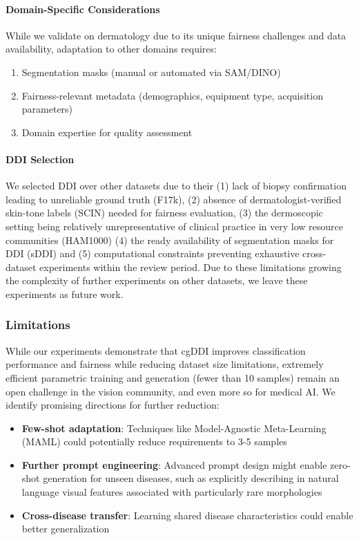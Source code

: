 \documentclass[11pt]{ucthesis}
\begin{document}
\paragraph{Domain-Specific Considerations}
While we validate on dermatology due to its unique fairness challenges and data availability, adaptation to other domains requires:
\begin{enumerate}
    \item Segmentation masks (manual or automated via SAM/DINO)
    \item Fairness-relevant metadata (demographics, equipment type, acquisition parameters)
    \item Domain expertise for quality assessment
\end{enumerate}

\paragraph{DDI Selection}
We selected DDI over other datasets due to their (1) lack of biopsy confirmation leading to unreliable ground truth (F17k), (2) absence of dermatologist-verified skin-tone labels (SCIN) needed for fairness evaluation, (3) the dermoscopic setting being relatively unrepresentative of clinical practice in very low resource communities (HAM1000) (4) the ready availability of segmentation masks for DDI (sDDI) and (5) computational constraints preventing exhaustive cross-dataset experiments within the review period. Due to these limitations growing the complexity of further experiments on other datasets, we leave these experiments as future work.

\subsubsection{Limitations}

\label{cgddi:sec:limits}

While our experiments demonstrate that cgDDI improves classification performance and fairness while reducing dataset size limitations, extremely efficient parametric training and generation (fewer than 10 samples) remain an open challenge in the vision community, and even more so for medical AI. We identify promising directions for further reduction:

\begin{itemize}
    \item \textbf{Few-shot adaptation}: Techniques like Model-Agnostic 
    Meta-Learning (MAML) could potentially reduce requirements to 3-5 samples
    \item \textbf{Further prompt engineering}: Advanced prompt design might enable 
    zero-shot generation for unseen diseases, such as explicitly describing in natural language visual features associated with particularly rare morphologies
    \item \textbf{Cross-disease transfer}: Learning shared disease 
    characteristics could enable better generalization
\end{itemize}
\end{document}
